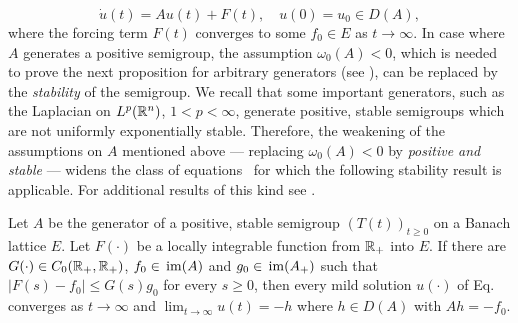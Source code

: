 \begin{equation}\label{eq:c4-1.6}
\dot{u}(t) = Au(t) + F(t), \quad u(0) = u_{0} \in D(A) ,
\end{equation}
where the forcing term $F(t)$ converges to some $f_{0} \in E$ as $t \to \infty$.
In case where $A$ generates a positive semigroup, the assumption \emph{$\omega_{0}(A) < 0$}, which is needed to prove the next proposition for arbitrary generators (see \textcite[ Theorem~4.4.4]{pazy:1983}), can be replaced by the \emph{stability} of the semigroup.
We recall that some important generators, such as the Laplacian on $L^{p}(\mathbb{R}^{n})$, $1 < p < \infty$, generate positive, stable semigroups which are not uniformly exponentially stable.
Therefore, the weakening of the assumptions on $A$ mentioned above --- \ie  replacing \emph{$\omega_{0}(A) < 0$} by \emph{positive and stable} --- widens the class of equations~ for which the following stability result is applicable.
For additional results of this kind see \textcite{neubrander:1985b}.
\begin{proposition}\label{prop:c4-1.11}
Let $A$ be the generator of a positive, stable semigroup $(T(t))_{t \geq 0}$ on a Banach lattice $E$.
Let $F(\cdot)$ be a locally integrable function from $\mathbb{R}_{+}$ into $E$.
If there are $G(\cdot) \in C_{0}(\mathbb{R}_{+},\mathbb{R}_{+})$, $f_{0} \in  \mathop{}\mathrm{im}(A)$ and $g_{0} \in \mathop{}\mathrm{im}(A_{+})$ such that $|F(s) - f_{0}| \leq G(s)g_{0}$ for every $s \geq 0$, then every mild solution $u(\cdot)$ of Eq.~ converges as $t \to \infty$ and $\lim_{t \to \infty} u(t) = -h$ where $h \in D(A)$ with $Ah = -f_{0}$.
\end{proposition}

